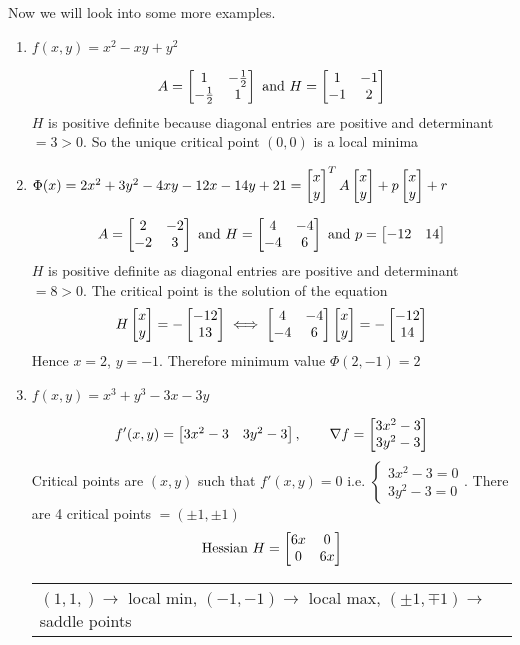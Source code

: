 Now we will look into some more examples.
\begin{enumerate}[label=\bfseries\tiny\protect\circled{\small\arabic*}]
	\item $f(x,y)=x^2-xy+y^2$
	
	$$A=\left[ \begin{matrix}
		1 & -\frac12\\ -\frac12 & 1
	\end{matrix} \right]\text{ and }H=\left[ \begin{matrix}
	1 & -1\\ -1 & 2
\end{matrix} \right]$$ $H$ is  positive definite because diagonal entries are positive and determinant $ =3>0$. So the unique critical point $(0,0)$ is a local minima

\item $\Phi(x)=2x^2+3y^2-4xy-12x-14y+21=\left[\begin{matrix}x\\y\end{matrix}\right]^TA\left[\begin{matrix}x\\ y\end{matrix}\right]+p\left[\begin{matrix}x\\ y\end{matrix}\right]+r$

$$A=\left[\begin{matrix}2& -2\\ -2 & 3\end{matrix}\right]\text{ and }H=\left[\begin{matrix}4 & -4\\ -4 & 6\end{matrix}\right]\text{ and }p=\left[\begin{matrix} -12 & 14\end{matrix}\right]$$ $H$ is positive definite as diagonal entries are positive and determinant $=8>0$. The critical point is the solution of the equation $$H\left[\begin{matrix}x\\ y\end{matrix}\right] = - \left[\begin{matrix} -12 \\ 13\end{matrix}\right] \iff \left[\begin{matrix}4 & -4\\ -4 & 6\end{matrix}\right]\left[\begin{matrix}x\\ y\end{matrix}\right]=-\left[\begin{matrix}-12\\ 14\end{matrix}\right]$$Hence $x=2$, $y=-1$. Therefore minimum value $\Phi(2,-1)=2$
\item $f(x,y)=x^3+y^3-3x-3y$

$$f'(x,y)=\left[\begin{matrix}3x^2-3 & 3y^2-3\end{matrix}\right], \qquad \nabla f=\left[\begin{matrix}3x^2-3\\ 3y^2-3\end{matrix}\right]$$Critical points are $(x,y)$ such that $f'(x,y)=0$ i.e. $\begin{cases}
	3x^2-3=0\\ 3y^2-3=0
\end{cases}$. There are 4 critical points $=(\pm 1, \pm 1)$ $$\text{Hessian }H=\left[\begin{matrix}6x & 0\\ 0 & 6x\end{matrix}\right]$$ \begin{center}
\begin{tabular}{l}
	$(1,1,)\to$ local min, 	$(-1,-1)\to$ local max, $(\pm 1,\mp 1)\to$ saddle points
\end{tabular}
\end{center}
 \end{enumerate}
